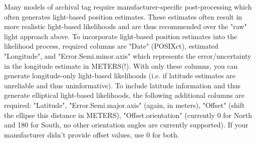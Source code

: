 \documentclass{article}\usepackage[]{graphicx}\usepackage[]{color}
\begin{document}
Many models of archival tag require manufacturer-specific post-processing which often generates light-based position estimates. These estimates often result in more realistic light-based likelihoods and are thus recommended over the "raw" light approach above. To incorporate light-based position estimates into the likelihood process, required columns are "Date" (POSIXct), estimated "Longitude", and "Error.Semi.minor.axis" which represents the error/uncertainty in the longitude estimate in METERS(!). With only these columns, you can generate longitude-only light-based likelihoods (i.e. if latitude estimates are unreliable and thus uninformative). To include latitude information and thus generate elliptical light-based likelihoods, the following additional columns are required: "Latitude", "Error.Semi.major.axis" (again, in meters), "Offset" (shift the ellipse this distance in METERS), "Offset.orientation" (currently 0 for North and 180 for South, no other orientation angles are currently supported). If your manufacturer didn't provide offset values, use 0 for both.
\end{document}
